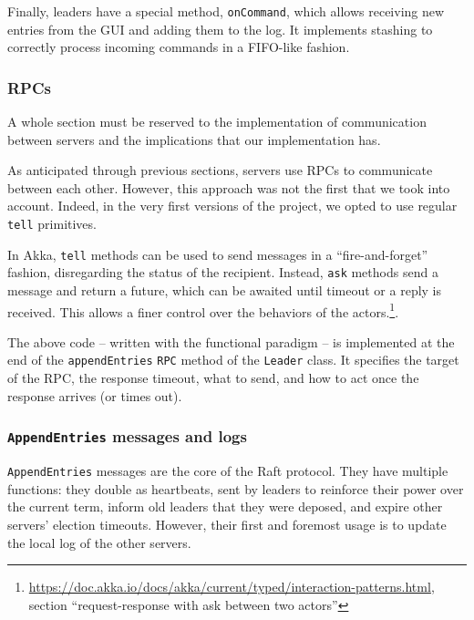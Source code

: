 Finally, leaders have a special method, \texttt{onCommand}, which allows receiving new  entries from the GUI and adding them to the log. It implements stashing to correctly process incoming commands in a FIFO-like fashion.

\subsubsection{RPCs}
\label{arch:rpc}

A whole section must be reserved to the implementation of communication between servers and the implications that our implementation has. 

As anticipated through previous sections, servers use RPCs to communicate between each other. However, this approach was not the first that we took into account. Indeed, in the very first versions of the project, we opted to use regular \texttt{tell} primitives.

In Akka, \texttt{tell} methods can be used to send messages in a ``fire-and-forget'' fashion, disregarding the status of the recipient. Instead, \texttt{ask} methods send a message and return a future, which can be awaited until timeout or a reply is received. This allows a finer control over the behaviors of the actors.\footnote{\url{https://doc.akka.io/docs/akka/current/typed/interaction-patterns.html}, section ``request-response with ask between two actors''}.


The above code -- written with the functional paradigm -- is implemented at the end of the \texttt{appendEntries} \texttt{RPC} method of the \texttt{Leader} class. It specifies the target of the RPC, the response timeout, what to send, and how to act once the response arrives (or times out).

\subsubsection{\texttt{AppendEntries} messages and logs}
\label{arch:appentries}

\texttt{AppendEntries} messages are the core of the Raft protocol. They have multiple functions: they double as heartbeats, sent by leaders to reinforce their power over the current term, inform old leaders that they were deposed, and expire other servers' election timeouts. However, their first and foremost usage is to update the local log of the other servers.

